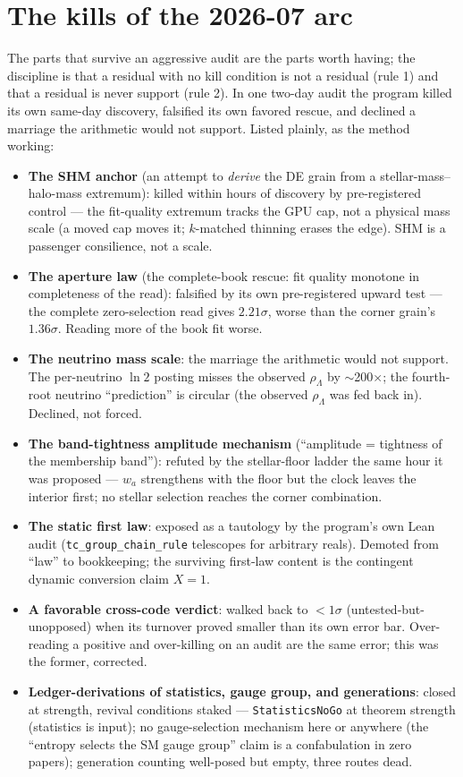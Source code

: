 \documentclass[11pt,a4paper]{article}
\begin{document}
\section{The kills of the 2026-07 arc}\label{sec:arc-kills}

The parts that survive an aggressive audit are the parts worth having; the discipline is that a residual with no kill condition is not a residual (rule 1) and that a residual is never support (rule 2). In one two-day audit the program killed its own same-day discovery, falsified its own favored rescue, and declined a marriage the arithmetic would not support. Listed plainly, as the method working:

\begin{itemize}[leftmargin=*,itemsep=0.4em]
\item \textbf{The SHM anchor} (an attempt to \emph{derive} the DE grain from a stellar-mass--halo-mass extremum): killed within hours of discovery by pre-registered control --- the fit-quality extremum tracks the GPU cap, not a physical mass scale (a moved cap moves it; $k$-matched thinning erases the edge). SHM is a passenger consilience, not a scale.
\item \textbf{The aperture law} (the complete-book rescue: fit quality monotone in completeness of the read): falsified by its own pre-registered upward test --- the complete zero-selection read gives $2.21\sigma$, worse than the corner grain's $1.36\sigma$. Reading more of the book fit worse.
\item \textbf{The neutrino mass scale}: the marriage the arithmetic would not support. The per-neutrino $\ln 2$ posting misses the observed $\rho_\Lambda$ by $\sim$200$\times$; the fourth-root neutrino ``prediction'' is circular (the observed $\rho_\Lambda$ was fed back in). Declined, not forced.
\item \textbf{The band-tightness amplitude mechanism} (``amplitude = tightness of the membership band''): refuted by the stellar-floor ladder the same hour it was proposed --- $w_a$ strengthens with the floor but the clock leaves the interior first; no stellar selection reaches the corner combination.
\item \textbf{The static first law}: exposed as a tautology by the program's own Lean audit (\texttt{tc\_group\_chain\_rule} telescopes for arbitrary reals). Demoted from ``law'' to bookkeeping; the surviving first-law content is the contingent dynamic conversion claim $X = 1$.
\item \textbf{A favorable cross-code verdict}: walked back to $<1\sigma$ (untested-but-unopposed) when its turnover proved smaller than its own error bar. Over-reading a positive and over-killing on an audit are the same error; this was the former, corrected.
\item \textbf{Ledger-derivations of statistics, gauge group, and generations}: closed at strength, revival conditions staked --- \texttt{StatisticsNoGo} at theorem strength (statistics is input); no gauge-selection mechanism here or anywhere (the ``entropy selects the SM gauge group'' claim is a confabulation in zero papers); generation counting well-posed but empty, three routes dead.
\end{itemize}
\end{document}
